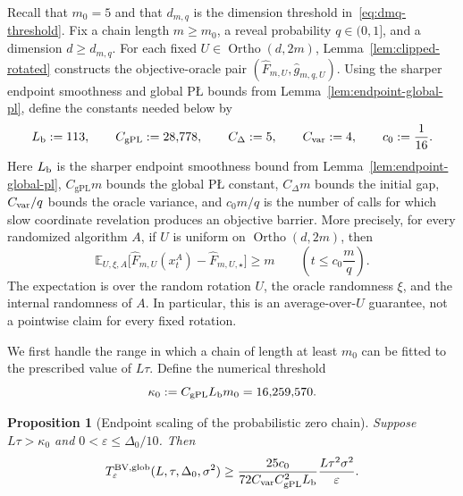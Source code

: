 \documentclass[11pt]{article}
\newtheorem{proposition}[theorem]{Proposition}
\newcommand{\E}{\mathbb{E}}
\newcommand{\Ortho}{\operatorname{Ortho}}
\begin{document}
Recall that $m_0=5$ and that $d_{m,q}$ is the dimension threshold in~\eqref{eq:dmq-threshold}. Fix a chain length
$m\ge m_0$, a reveal probability $q\in(0,1]$, and a dimension $d\ge d_{m,q}$. For each fixed
$U\in\Ortho(d,2m)$, Lemma~\ref{lem:clipped-rotated} constructs the objective-oracle pair
$(\widehat F_{m,U},\widehat g_{m,q,U})$. Using the sharper endpoint smoothness and global P\L{}
bounds from Lemma~\ref{lem:endpoint-global-pl}, define the constants needed below by
\begingroup
\begin{equation}
\label{eq:endpoint-base-constants}
L_{\rm b}:=113,
\qquad
C_{\mathrm{gPL}}:=28{,}778,
\qquad
C_\Delta:=5,
\qquad
C_{\rm var}:=4,
\qquad
c_0:=\frac1{16}.
\end{equation}
Here $L_{\rm b}$ is the sharper endpoint smoothness bound from Lemma~\ref{lem:endpoint-global-pl},
$C_{\mathrm{gPL}}m$ bounds the global P\L{} constant,
$C_\Delta m$ bounds the initial gap, $C_{\rm var}/q$ bounds the oracle variance, and $c_0m/q$ is the number of
calls for which slow coordinate revelation produces an objective barrier. More precisely, for every randomized
algorithm $A$, if $U$ is uniform on $\Ortho(d,2m)$, then
\[
\E_{U,\xi,A}\bigl[
\widehat F_{m,U}(x_t^A)-\widehat F_{m,U,\star}
\bigr]
\ge m
\qquad
\left(t\le c_0\frac{m}{q}\right).
\]
The expectation is over the random rotation $U$, the oracle randomness $\xi$, and the internal randomness of $A$.
In particular, this is an average-over-$U$ guarantee, not a pointwise claim for every fixed rotation.
\endgroup

\begingroup
We first handle the range in which a chain of length at least $m_0$ can be fitted to the prescribed value of
$L\tau$. Define the numerical threshold
\begin{equation}
\label{eq:endpoint-kappa-threshold}
\kappa_0:=C_{\mathrm{gPL}}L_{\rm b}m_0=16{,}259{,}570.
\end{equation}
\endgroup

\begingroup
\begin{proposition}[Endpoint scaling of the probabilistic zero chain]
\label{prop:endpoint-large-condition}
Suppose $L\tau>\kappa_0$ and $0<\varepsilon\le\Delta_0/10$. Then
\[
T_\varepsilon^{\mathrm{BV,glob}}(L,\tau,\Delta_0,\sigma^2)
\ge
\frac{25c_0}{72C_{\rm var}C_{\mathrm{gPL}}^2L_{\rm b}}
\frac{L\tau^2\sigma^2}{\varepsilon}.
\]
\end{proposition}
\endgroup
\end{document}

